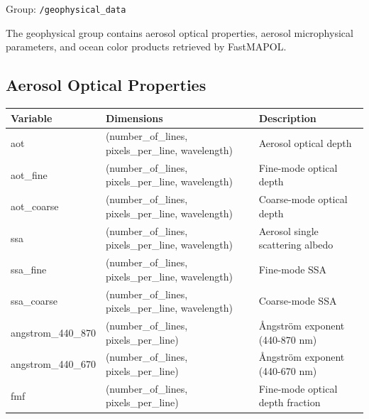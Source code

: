 \documentclass[
  letterpaper,
]{scrbook}
\begin{document}
Group: \texttt{/geophysical\_data}

The geophysical group contains aerosol optical properties, aerosol
microphysical parameters, and ocean color products retrieved by
FastMAPOL.

\subsection{Aerosol Optical
Properties}\label{aerosol-optical-properties}

\begin{longtable}[]{@{}
  >{\raggedright\arraybackslash}p{}
  >{\raggedright\arraybackslash}p{}
  >{\raggedright\arraybackslash}p{}@{}}
\toprule\noalign{}
\begin{minipage}[b]{\linewidth}\raggedright
Variable
\end{minipage} & \begin{minipage}[b]{\linewidth}\raggedright
Dimensions
\end{minipage} & \begin{minipage}[b]{\linewidth}\raggedright
Description
\end{minipage} \\
\midrule\noalign{}
\endhead
\bottomrule\noalign{}
\endlastfoot
aot & (number\_of\_lines, pixels\_per\_line, wavelength) & Aerosol
optical depth \\
aot\_fine & (number\_of\_lines, pixels\_per\_line, wavelength) &
Fine-mode optical depth \\
aot\_coarse & (number\_of\_lines, pixels\_per\_line, wavelength) &
Coarse-mode optical depth \\
ssa & (number\_of\_lines, pixels\_per\_line, wavelength) & Aerosol
single scattering albedo \\
ssa\_fine & (number\_of\_lines, pixels\_per\_line, wavelength) &
Fine-mode SSA \\
ssa\_coarse & (number\_of\_lines, pixels\_per\_line, wavelength) &
Coarse-mode SSA \\
angstrom\_440\_870 & (number\_of\_lines, pixels\_per\_line) & Ångström
exponent (440-870 nm) \\
angstrom\_440\_670 & (number\_of\_lines, pixels\_per\_line) & Ångström
exponent (440-670 nm) \\
fmf & (number\_of\_lines, pixels\_per\_line) & Fine-mode optical depth
fraction \\
\end{longtable}
\end{document}
